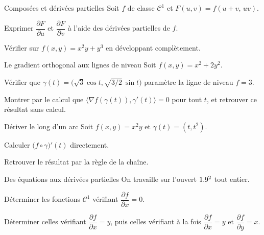 \begin{exercice}[2]{Composées et dérivées partielles}
Soit $f$ de classe $\mathcal{C}^{1}$ et
$F(u,v)=f(u+v,\,uv)$.
\begin{questions}
  \item Exprimer $\dfrac{\partial F}{\partial u}$ et
    $\dfrac{\partial F}{\partial v}$ à l'aide des dérivées partielles de
    $f$.
  \item Vérifier sur $f(x,y)=x^{2}y+y^{3}$ en développant complètement.
\end{questions}
\end{exercice}

\begin{exercice}[2]{Le gradient orthogonal aux lignes de niveau}
Soit $f(x,y)=x^{2}+2y^{2}$.
\begin{questions}
  \item Vérifier que
    $\gamma(t)=\bigl(\sqrt3\cos t,\sqrt{3/2}\,\sin t\bigr)$ paramètre la
    ligne de niveau $f=3$.
  \item Montrer par le calcul que
    $\bigl\langle\nabla f(\gamma(t)),\gamma'(t)\bigr\rangle=0$ pour tout
    $t$, et retrouver ce résultat sans calcul.
\end{questions}
\end{exercice}

\begin{exercice}[2]{Dériver le long d'un arc}
Soit $f(x,y)=x^{2}y$ et $\gamma(t)=(t,t^{2})$.
\begin{questions}
  \item Calculer $\bigl(f\circ\gamma\bigr)'(t)$ directement.
  \item Retrouver le résultat par la règle de la chaîne.
\end{questions}
\end{exercice}

\begin{exercice}[2]{Des équations aux dérivées partielles}
On travaille sur l'ouvert $1.9^{2}$ tout entier.
\begin{questions}
  \item Déterminer les fonctions $\mathcal{C}^{1}$ vérifiant
    $\dfrac{\partial f}{\partial x}=0$.
  \item Déterminer celles vérifiant
    $\dfrac{\partial f}{\partial x}=y$, puis celles vérifiant à la fois
    $\dfrac{\partial f}{\partial x}=y$ et
    $\dfrac{\partial f}{\partial y}=x$.
\end{questions}
\end{exercice}

